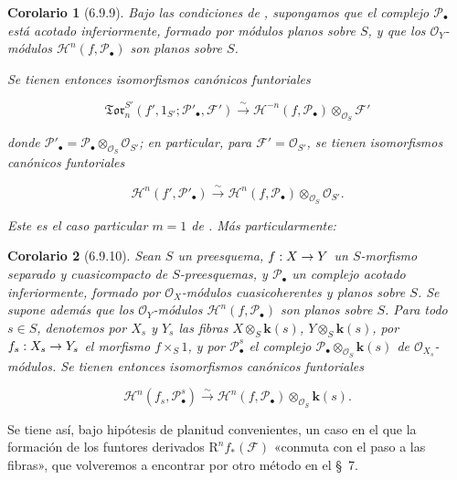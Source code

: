 \documentclass[10pt,oneside,openany]{book}
\theoremstyle{egaenv}\newtheorem*{env}{---}
\theoremstyle{egastatement}
\newtheorem*{corollary}{Corolario}
\theoremstyle{egadescription}
\newcommand{\oldpage}[2][]{\marginnote{\normalfont\scriptsize\textbf{#1}\,|\,#2}\ignorespaces}
\renewcommand{\to}{\mathchoice{\longrightarrow}{\rightarrow}{\rightarrow}{\rightarrow}}
\begin{document}
\begin{corollary}[6.9.9]
\label{III.6.9.9}
Bajo las condiciones de , supongamos que el complejo
$\mathscr P_\bullet$ está acotado inferiormente, formado por módulos planos
sobre $S$, y que los $\mathscr O_Y$-módulos
$\mathscr H^n(f,\mathscr P_\bullet)$ son planos sobre $S$.

\oldpage[III]{171}
Se tienen entonces isomorfismos canónicos funtoriales

\label{III.6.9.9.1}
\[
  \mathfrak{Tor}_n^{S'}
  (f',1_{S'};\mathscr P'_\bullet,\mathscr F')
  \xrightarrow{\sim}
  \mathscr H^{-n}(f,\mathscr P_\bullet)
  \otimes_{\mathscr O_S}\mathscr F'
  \tag{6.9.9.1}\label{III.6.9.9.1.fr}
\]

donde
$\mathscr P'_\bullet=\mathscr P_\bullet\otimes_{\mathscr O_S}
\mathscr O_{S'}$; en particular, para $\mathscr F'=\mathscr O_{S'}$, se
tienen isomorfismos canónicos funtoriales

\label{III.6.9.9.2}
\[
  \mathscr H^n(f',\mathscr P'_\bullet)
  \xrightarrow{\sim}
  \mathscr H^n(f,\mathscr P_\bullet)
  \otimes_{\mathscr O_S}\mathscr O_{S'}.
  \tag{6.9.9.2}\label{III.6.9.9.2.fr}
\]

\textup{Este es el caso particular $m=1$ de . Más particularmente:}
\end{corollary}

\begin{corollary}[6.9.10]
\label{III.6.9.10}
Sean $S$ un preesquema, $f:X\to Y$ un $S$-morfismo separado y cuasicompacto
de $S$-preesquemas, y $\mathscr P_\bullet$ un complejo acotado
inferiormente, formado por $\mathscr O_X$-módulos cuasicoherentes y planos
sobre $S$. Se supone además que los $\mathscr O_Y$-módulos
$\mathscr H^n(f,\mathscr P_\bullet)$ son planos sobre $S$. Para todo $s\in S$,
denotemos por $X_s$ y $Y_s$ las fibras
$X\otimes_S \boldsymbol{k}(s)$, $Y\otimes_S \boldsymbol{k}(s)$,
por $f_s:X_s\to Y_s$ el morfismo $f\times_S1$, y por
$\mathscr P_\bullet^s$ el complejo
$\mathscr P_\bullet\otimes_{\mathscr O_S}\boldsymbol{k}(s)$ de
$\mathscr O_{X_s}$-módulos. Se tienen entonces isomorfismos canónicos
funtoriales

\label{III.6.9.10.1}
\[
  \mathscr H^n(f_s,\mathscr P_\bullet^s)
  \xrightarrow{\sim}
  \mathscr H^n(f,\mathscr P_\bullet)\otimes_{\mathscr O_S}\boldsymbol{k}(s).
  \tag{6.9.10.1}\label{III.6.9.10.1.fr}
\]

\end{corollary}

Se tiene así, bajo hipótesis de planitud convenientes, un caso en el que la
formación de los funtores derivados $\mathrm R^nf_*(\mathscr F)$ «conmuta con el paso
a las fibras», que volveremos a encontrar por otro método en el §~7.
\end{document}
